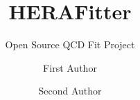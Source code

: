 %
%
%
%
%
%
%
\documentclass[twocolumn,epjc3]{svjour3}  
%
\smartqed  %
%
\RequirePackage{graphicx}
%
 \RequirePackage{mathptmx}      %
%
%

\usepackage[hypertexnames,setpagesize,%
    pdftex,%
    colorlinks,%
    citecolor=blue,%
    hyperindex,%
    plainpages=false,%
    bookmarksopen,%
    bookmarksnumbered%
  ]{hyperref}

\usepackage[numbers,square,comma,sort&compress]{natbib}
\usepackage{textcomp}


\newcommand\fitter{ \mbox{\tt HERAFitter} }


%
%


\title{HERAFitter %
}
\subtitle{Open Source QCD Fit Project}


\author{First Author
        \and
        Second Author %
}


